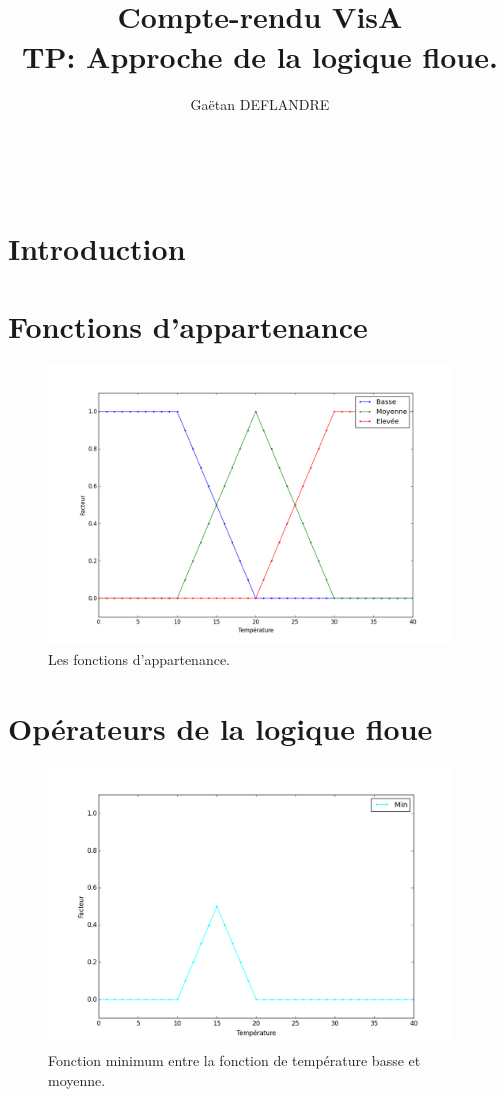 \documentclass[a4paper,11pt]{article}
\title{
  \noindent\hrulefill \\
  \vspace{10mm}
  \textbf{Compte-rendu VisA} \\
  \vspace{5mm}
  TP: Approche de la logique floue.
}
\author{Gaëtan DEFLANDRE}
\begin{document}
\maketitle
\noindent\hrulefill \\


\section*{Introduction}

\newpage


\section{Fonctions d'appartenance}

\begin{figure}[H]
  \begin{center}
  \includegraphics[height=280px]{images/exercice1.png}
  \caption{Les fonctions d'appartenance.}
  \end{center}
\end{figure}




\section{Opérateurs de la logique floue}

\begin{figure}[H]
  \begin{center}
  \includegraphics[height=280px]{images/min.png}
  \caption{Fonction minimum entre la fonction de température basse et moyenne.}
  \end{center}
\end{figure}
\end{document}
